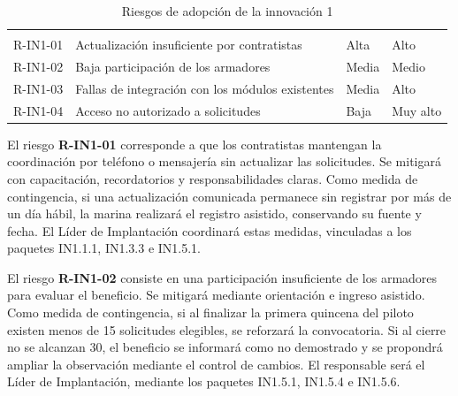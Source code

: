 \begin{longtable}{
  L{\tabcolsep\relax}
  L{\tabcolsep\relax}
  L{\tabcolsep\relax}
  L{\tabcolsep\relax}
}
  \caption{Riesgos de adopción de la innovación 1}
  \label{tab:riesgos-innovacion-1}\\
  \hline
   &
   &
   &
   \\
  \hline
  \endfirsthead

  \hline
   &
   &
   &
   \\
  \hline
  \endhead

  R-IN1-01 & Actualización insuficiente por contratistas &
  Alta & Alto \\
  \hline

  R-IN1-02 & Baja participación de los armadores &
  Media & Medio \\
  \hline

  R-IN1-03 & Fallas de integración con los módulos existentes &
  Media & Alto \\
  \hline

  R-IN1-04 & Acceso no autorizado a solicitudes &
  Baja & Muy alto \\
  \hline
\end{longtable}


El riesgo \textbf{R-IN1-01} corresponde a que los contratistas mantengan
la coordinación por teléfono o mensajería sin actualizar las solicitudes.
Se mitigará con capacitación, recordatorios y responsabilidades claras.
Como medida de contingencia, si una actualización comunicada permanece
sin registrar por más de un día hábil, la marina realizará el registro
asistido, conservando su fuente y fecha. El Líder de Implantación
coordinará estas medidas, vinculadas a los paquetes IN1.1.1, IN1.3.3
e IN1.5.1.

El riesgo \textbf{R-IN1-02} consiste en una participación insuficiente
de los armadores para evaluar el beneficio. Se mitigará mediante
orientación e ingreso asistido. Como medida de contingencia, si al
finalizar la primera quincena del piloto existen menos de 15 solicitudes
elegibles, se reforzará la convocatoria. Si al cierre no se alcanzan
30, el beneficio se informará como no demostrado y se propondrá ampliar
la observación mediante el control de cambios. El responsable será
el Líder de Implantación, mediante los paquetes IN1.5.1, IN1.5.4
e IN1.5.6.


